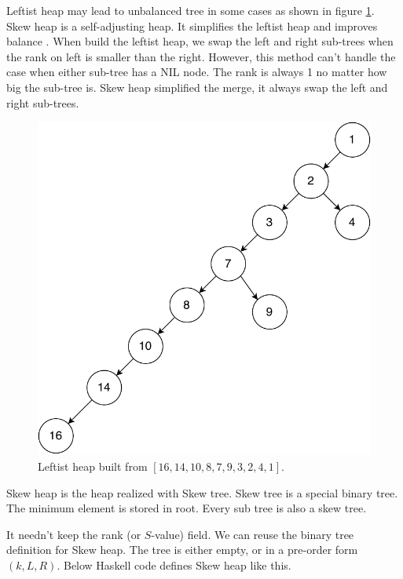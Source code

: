 \documentclass[b5paper]{article}
\begin{document}
Leftist heap may lead to unbalanced tree in some cases as shown in figure \ref{fig:unbalanced-leftist-tree}. Skew heap is a self-adjusting heap. It simplifies the leftist heap and improves balance\cite{wiki-skew-heap} \cite{self-adjusting-heaps}. When build the leftist heap, we swap the left and right sub-trees when the rank on left is smaller than the right. However, this method can't handle the case when either sub-tree has a NIL node. The rank is always 1 no matter how big the sub-tree is. Skew heap simplified the merge, it always swap the left and right sub-trees.

\begin{figure}[htbp]
  \centering
  \includegraphics[scale=0.45]{img/unbalanced-leftist-tree}
  \caption{Leftist heap built from $[16, 14, 10, 8, 7, 9, 3, 2, 4, 1]$.}
  \label{fig:unbalanced-leftist-tree}
\end{figure}

Skew heap is the heap realized with Skew tree. Skew tree is a special
binary tree. The minimum element is stored in root. Every sub tree is
also a skew tree.

It needn't keep the rank (or $S$-value) field. We can reuse the
binary tree definition for Skew heap. The tree is either empty,
or in a pre-order form $(k, L, R)$. Below Haskell code defines
Skew heap like this.
\end{document}

